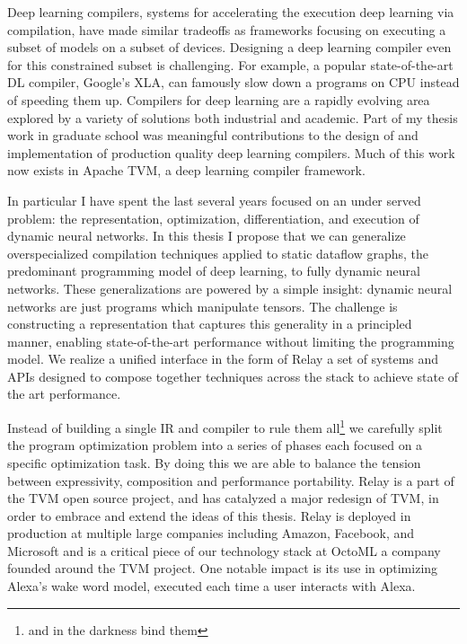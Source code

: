 Deep learning compilers, systems for accelerating the execution deep learning via compilation,
 have made similar tradeoffs as frameworks focusing on executing a subset of models on a subset of devices.
Designing a deep learning compiler even for this constrained subset is challenging.
For example,
  a popular state-of-the-art DL compiler,
  Google's XLA, can famously slow down a programs on
  CPU instead of speeding them up.
Compilers for deep learning are a rapidly evolving area explored by a
  variety of solutions both industrial and academic.
Part of my thesis work in graduate school
  was meaningful contributions to the design of and implementation of
  production quality deep learning compilers.
Much of this work now exists in Apache TVM, a deep learning compiler framework.

In particular I have spent the last several years focused on an under served problem:
  the representation,
  optimization,
  differentiation,
  and execution of dynamic neural networks.
In this thesis I propose that we can generalize overspecialized
  compilation techniques applied to static dataflow graphs,
  the predominant programming model of deep learning,
  to fully dynamic neural networks.
These generalizations are powered by a simple insight:
  dynamic neural networks are just programs which manipulate tensors.
The challenge is constructing a representation that captures this generality
  in a principled manner, enabling state-of-the-art performance without limiting the programming model.
We realize a unified interface in the form of Relay a set of systems and APIs designed
  to compose together techniques across the stack to achieve state of the art performance.

Instead of building a single IR and compiler to rule them all\footnote{and in the darkness bind them}
  we carefully split the program optimization problem into a series of
  phases each focused on a specific optimization task.
By doing this we are able to balance the tension between expressivity, composition
  and performance portability.
Relay is a part of the TVM open source project, and has catalyzed a major redesign of
  TVM, in order to embrace and extend the ideas of this thesis.
Relay is deployed in production at multiple large companies including
  Amazon, Facebook, and Microsoft and is a critical piece of our technology stack
  at OctoML a company founded around the TVM project.
One notable impact is its use in
  optimizing Alexa’s wake word model, executed each time a user interacts with
  Alexa.

